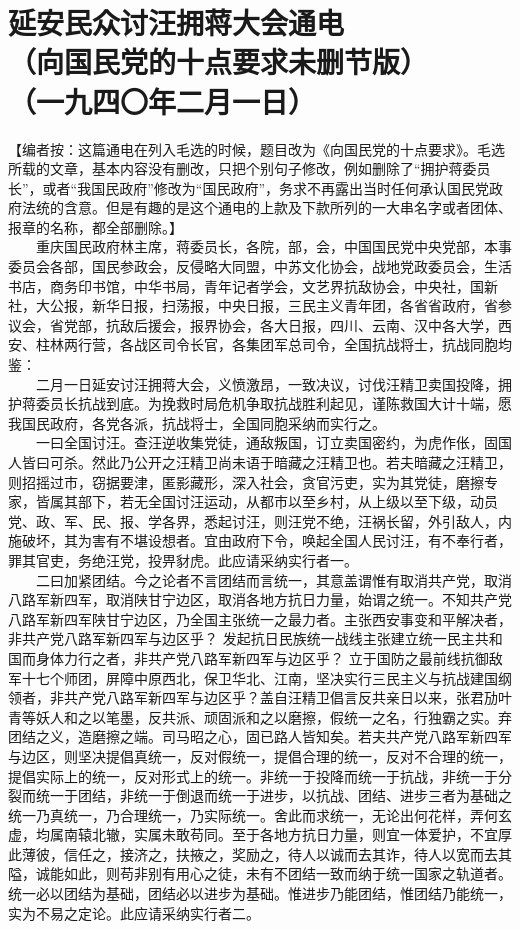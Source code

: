 \documentclass[cn,11pt,chinese]{elegantbook}
\def\myformat#1{\hfil\hfil #1}
\begin{document}
\section*{\myformat{延安民众讨汪拥蒋大会通电}\\\myformat{（向国民党的十点要求未删节版）\\\myformat{（一九四〇年二月一日）}}}
【编者按：这篇通电在列入毛选的时候，题目改为《向国民党的十点要求》。毛选所载的文章，基本内容没有删改，只把个别句子修改，例如删除了“拥护蒋委员长”，或者“我国民政府”修改为“国民政府”，务求不再露出当时任何承认国民党政府法统的含意。但是有趣的是这个通电的上款及下款所列的一大串名字或者团体、报章的名称，都全部删除。】\\
　　重庆国民政府林主席，蒋委员长，各院，部，会，中国国民党中央党部，本事委员会各部，国民参政会，反侵略大同盟，中苏文化协会，战地党政委员会，生活书店，商务印书馆，中华书局，青年记者学会，文艺界抗敌协会，中央社，国新社，大公报，新华日报，扫荡报，中央日报，三民主义青年团，各省省政府，省参议会，省党部，抗敌后援会，报界协会，各大日报，四川、云南、汉中各大学，西安、柱林两行营，各战区司令长官，各集团军总司令，全国抗战将士，抗战同胞均鉴：\\
　　二月一日延安讨汪拥蒋大会，义愤激昂，一致决议，讨伐汪精卫卖国投降，拥护蒋委员长抗战到底。为挽救时局危机争取抗战胜利起见，谨陈救国大计十端，愿我国民政府，各党各派，抗战将士，全国同胞采纳而实行之。\\
　　一曰全国讨汪。查汪逆收集党徒，通敌叛国，订立卖国密约，为虎作伥，固国人皆曰可杀。然此乃公开之汪精卫尚未语于暗藏之汪精卫也。若夫暗藏之汪精卫，则招摇过市，窃据要津，匿影藏形，深入社会，贪官污吏，实为其党徒，磨擦专家，皆属其部下，若无全国讨汪运动，从都市以至乡村，从上级以至下级，动员党、政、军、民、报、学各界，悉起讨汪，则汪党不绝，汪祸长留，外引敌人，内施破坏，其为害有不堪设想者。宜由政府下令，唤起全国人民讨汪，有不奉行者，罪其官吏，务绝汪党，投畀豺虎。此应请采纳实行者一。\\
　　二曰加紧团结。今之论者不言团结而言统一，其意盖谓惟有取消共产党，取消八路军新四军，取消陕甘宁边区，取消各地方抗日力量，始谓之统一。不知共产党八路军新四军陕甘宁边区，乃全国主张统一之最力者。主张西安事变和平解决者，非共产党八路军新四军与边区乎？ 发起抗日民族统一战线主张建立统一民主共和国而身体力行之者，非共产党八路军新四军与边区乎？ 立于国防之最前线抗御敌军十七个师团，屏障中原西北，保卫华北、江南，坚决实行三民主义与抗战建国纲领者，非共产党八路军新四军与边区乎？盖自汪精卫倡言反共亲日以来，张君劢叶青等妖人和之以笔墨，反共派、顽固派和之以磨擦，假统一之名，行独霸之实。弃团结之义，造磨擦之端。司马昭之心，固已路人皆知矣。若夫共产党八路军新四军与边区，则坚决提倡真统一，反对假统一，提倡合理的统一，反对不合理的统一，提倡实际上的统一，反对形式上的统一。非统一于投降而统一于抗战，非统一于分裂而统一于团结，非统一于倒退而统一于进步，以抗战、团结、进步三者为基础之统一乃真统一，乃合理统一，乃实际统一。舍此而求统一，无论出何花样，弄何玄虚，均属南辕北辙，实属未敢苟同。至于各地方抗日力量，则宜一体爱护，不宜厚此薄彼，信任之，接济之，扶掖之，奖励之，待人以诚而去其诈，待人以宽而去其隘，诚能如此，则苟非别有用心之徒，未有不团结一致而纳于统一国家之轨道者。统一必以团结为基础，团结必以进步为基础。惟进步乃能团结，惟团结乃能统一，实为不易之定论。此应请采纳实行者二。\\
\end{document}
